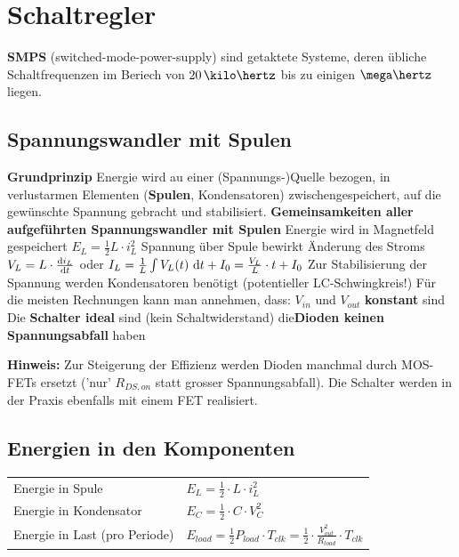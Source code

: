 \section{Schaltregler}

\textbf{SMPS} (switched-mode-power-supply) sind getaktete Systeme, deren übliche Schaltfrequenzen im Beriech von 
$20 \, \kilo \hertz$ bis zu einigen $\mega \hertz$ liegen.


\subsection{Spannungswandler mit Spulen}

\begin{outline}
    \1 \textbf{Grundprinzip}
        \2 Energie wird au einer (Spannungs-)Quelle bezogen, in verlustarmen Elementen (\textbf{Spulen}, Kondensatoren) 
            zwischengespeichert, auf die gewünschte Spannung gebracht und stabilisiert.
    \1 \textbf{Gemeinsamkeiten aller aufgeführten Spannungswandler mit Spulen}
        \2 Energie wird in Magnetfeld gespeichert $E_L = \frac{1}{2} L \cdot i_L^2$
        \2 Spannung über Spule bewirkt Änderung des Stroms \\
            $V_L = L \cdot \frac{\mathop{} \! \mathrm{d} i_L}{\mathop{} \! \mathrm{d} t}$ oder $I_L= \frac{1}{L} \int V_L(t) \, \mathop{} \! \mathrm{d} t + I_0  = \frac{V_L}{L} \cdot t + I_0$ 
        \2 Zur Stabilisierung der Spannung werden Kondensatoren benötigt (potentieller LC-Schwingkreis!)
        \2 Für die meisten Rechnungen kann man annehmen, dass:
            \3 $V_{in}$ und $V_{out}$ \textbf{konstant} sind
            \3 Die \textbf{Schalter ideal} sind (kein Schaltwiderstand)
            \3 die\textbf{Dioden keinen Spannungsabfall} haben
\end{outline}

\textbf{Hinweis:} Zur Steigerung der Effizienz werden Dioden manchmal durch MOS-FETs ersetzt ('nur' $R_{DS,on}$ statt grosser
Spannungsabfall). Die Schalter werden in der Praxis ebenfalls mit einem FET realisiert.

\subsection{Energien in den Komponenten}

\renewcommand{\arraystretch}{1.2}
\begin{tabular}{ll}
    Energie in Spule                & $E_L = \frac{1}{2} \cdot L \cdot i_L^2$ \\
    Energie in Kondensator          & $E_C = \frac{1}{2} \cdot C \cdot V_C^2$ \\
    Energie in Last (pro Periode)   & $E_{load} = \frac{1}{2} P_{load} \cdot T_{clk} = \frac{1}{2} \cdot \frac{V_{out}^2}{R_{load}} \cdot T_{clk}$
\end{tabular}
\renewcommand{\arraystretch}{1}


